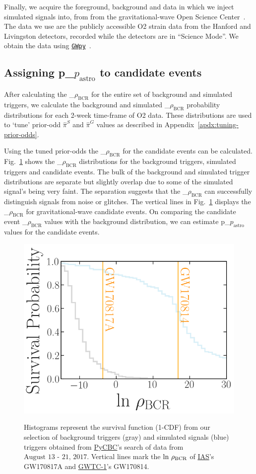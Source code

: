 \documentclass[%
 nofootinbib,
 amsmath,amssymb,
 aps,
 twocolumn,
 superscriptaddress
]{revtex4-2}
\newcommand{\gwpy}{{\sc \href{https://gwpy.github.io/}{\texttt{GWpy}}}\xspace}
\newcommand{\pycbc}{{\sc \href{https://pycbc.org/}{{PyCBC}}}\xspace}
\newcommand{\GWTC}{{\sc \href{https://ui.adsabs.harvard.edu/abs/2019PhRvX...9c1040A/abstract}{{GWTC-1}}}\xspace}
\newcommand{\IAS}{{\sc \href{https://ui.adsabs.harvard.edu/abs/2020PhRvD.101h3030V/abstract}{{IAS}}}\xspace}
\newcommand{\fancytext}[1]{{\relax\ifmmode#1\else $#1$\fi}\xspace}
\newcommand{\mathcmd}[1]{{\sc \relax\ifmmode#1\else $#1$\fi}\xspace}
\newcommand{\bcr}{\mathcmd{\rho_\text{BCR}}}
\newcommand{\pastro}{\fancytext{p_\text{astro}}}
\begin{document}
Finally, we acquire the foreground, background and data in which we inject simulated signals into, from from the gravitational-wave Open Science Center~\cite{GWOSC}. The data we use are the publicly accessible O2 strain data from the Hanford and Livingston detectors, recorded while the detectors are in ``Science Mode''. We obtain the data using \gwpy~\cite{gwpy}. 

\subsection{Assigning \pastro to candidate events}
After calculating the \bcr for the entire set of background and simulated triggers, we calculate the background and simulated \bcr probability distributions for each 2-week time-frame of O2 data. These distributions are used to `tune' prior-odd $\hat{\pi}^S$ and $\hat{\pi}^G$ values as described in Appendix~\ref{apdx:tuning-prior-odds}.

Using the tuned prior-odds the \bcr for the candidate events can be calculated. Fig.~\ref{fig:bcrCdf} shows the \bcr distributions for the background triggers, simulated triggers and candidate events. The bulk of the background and simulated trigger distributions are separate but slightly overlap due to some of the simulated signal's being very faint. The separation suggests that the \bcr can successfully distinguish signals from noise or glitches. The vertical lines in Fig.~\ref{fig:bcrCdf} displays the \bcr for gravitational-wave candidate events. On comparing the candidate event \bcr values with the background distribution, we can estimate \pastro values for the candidate events. 

\begin{figure}[!ht]
{\centering \includegraphics[width=0.85\linewidth]{images/reweighted_bcr_cdf_smaller_legend.png} }
\caption[BCR distribution example]{Histograms represent the survival function (1-CDF) from our selection of background triggers (gray) and simulated signals (blue) triggers obtained from \pycbc's search of data from $\text{August 13 - 21, 2017}$. Vertical lines mark the $\text{ln}\ \bcr$ of \IAS's GW170817A and \GWTC's GW170814.}\label{fig:bcrCdf}
\end{figure}
\end{document}
